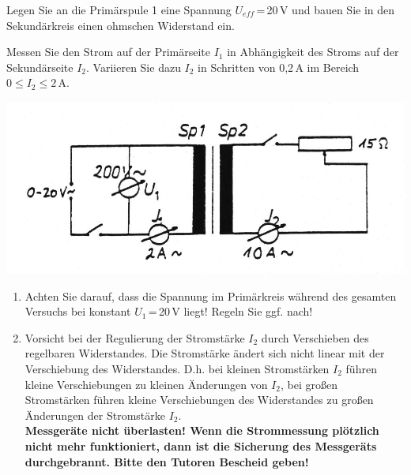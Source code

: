 \begin{enumerate}
	\noindent
	Legen Sie an die Primärspule 1 eine Spannung $U_{eff}$\,=\,20\,V und bauen Sie in den Sekundärkreis einen ohmschen Widerstand ein.\\
		\begin{minipage}{0.55\textwidth}
			Messen Sie den Strom auf der Primärseite $I_1$ in Abhängigkeit des Stroms auf der Sekundärseite $I_2$. Variieren Sie dazu $I_2$ in Schritten von 0,2\,A im Bereich $0\leq I_2\leq 2$\,A.\\
		\end{minipage}
		\begin{minipage}{0.45\textwidth}
			\includegraphics[width=\textwidth]{Abbildungen/BILD22.jpg}
			\label{fig:Bild22}
		\end{minipage}
		
	\begin{hint}
	\begin{enumerate}[label={\roman*}.]
		\item Achten Sie darauf, dass die Spannung im Primärkreis während des gesamten Versuchs bei konstant $U_1$\,=\,20\,V liegt! Regeln Sie ggf. nach!
		\item Vorsicht bei der Regulierung der Stromstärke $I_2$ durch Verschieben des regelbaren Widerstandes. Die Stromstärke ändert sich nicht linear mit der Verschiebung des Widerstandes. D.h. bei kleinen Stromstärken $I_2$ 
			führen kleine Verschiebungen zu kleinen Änderungen von $I_2$, bei großen Stromstärken führen kleine Verschiebungen des Widerstandes zu großen Änderungen der Stromstärke $I_2$.\\
			\textbf{Messgeräte nicht überlasten! Wenn die Strommessung plötzlich nicht mehr funktioniert, dann ist die Sicherung des Messgeräts durchgebrannt. Bitte den Tutoren Bescheid geben!}
	\end{enumerate}
	\end{hint}
\end{enumerate}

